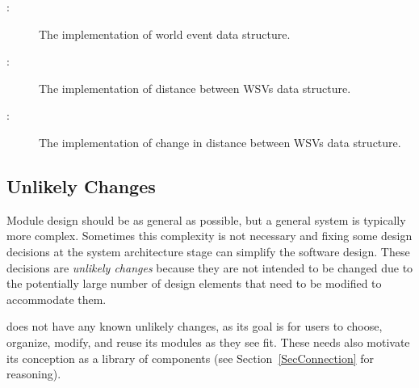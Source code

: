 \begin{description}
    \item[ \actheacnum \label{acWorldStateChangeImpl}:]
    The implementation of world event data structure.

    \item[ \actheacnum \label{acDistanceImpl}:] The
    implementation of distance between WSVs data structure.

    \item[ \actheacnum \label{acDistanceChangeImpl}:] The
    implementation of change in distance between WSVs data structure.

\end{description}

\subsection{Unlikely Changes}\label{SecUchange}
Module design should be as general as possible, but a general system is
typically more complex. Sometimes this complexity is not necessary and fixing
some design decisions at the system architecture stage can simplify the
software design. These decisions are \textit{unlikely changes} because they are
not intended to be changed due to the potentially large number of design
elements that need to be modified to accommodate them.

\progname{} does not have any known unlikely changes, as its goal is for users
to choose, organize, modify, and reuse its modules as they see fit. These needs
also motivate its conception as a library of components (see
Section~\ref{SecConnection} for reasoning).